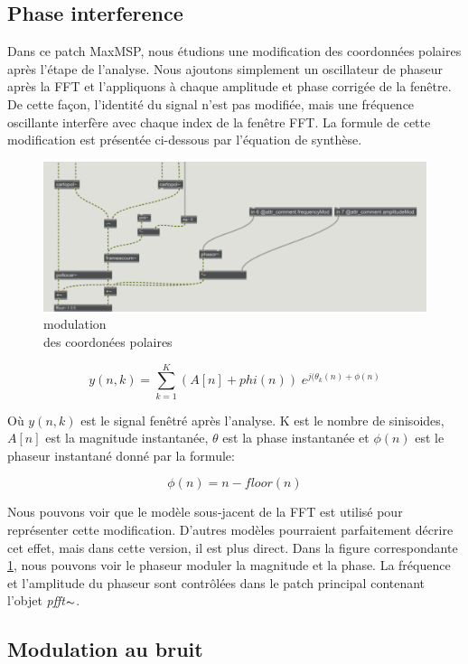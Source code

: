 \subsection{Phase interference}
    Dans ce patch MaxMSP, nous étudions une modification des coordonnées polaires après l’étape de l’analyse. Nous ajoutons simplement un oscillateur de phaseur après la FFT et l’appliquons à chaque amplitude et phase corrigée de la fenêtre. De cette façon, l'identité du signal n'est pas modifiée, mais une fréquence oscillante interfère avec chaque index de la fenêtre FFT. La formule de cette modification est présentée ci-dessous par l'équation de synthèse.

\begin{figure}
  \centering
  \includegraphics[width= 0.5 \textwidth]{Graphs/phasorInt.png}
  \caption{modulation \\ des coordonées polaires}
  \label{phasorInt}
\end{figure}

    \begin{equation}
      y(n, k) = \sum_{k=1}^K (A[n]+phi(n)) \; e^{j (\theta_k(n) +\phi(n)}
    \end{equation}
    
    Où $y (n, k)$ est le signal fenêtré après l'analyse. K est le nombre de sinisoides, $ A [n] $ est la magnitude instantanée, $ \theta $ est la phase instantanée et $ \phi (n) $ est le phaseur instantané donné par la formule:

    \begin{equation*}
        \phi(n) = n - floor(n)
    \end{equation*}

    Nous pouvons voir que le modèle sous-jacent de la FFT est utilisé pour représenter cette modification. D'autres modèles pourraient parfaitement décrire cet effet, mais dans cette version, il est plus direct. Dans la figure correspondante \ref{phasorInt}, nous pouvons voir le phaseur moduler la magnitude et la phase. La fréquence et l'amplitude du phaseur sont contrôlées dans le patch principal contenant l'objet \textit{pfft$\thicksim $}.

\subsection{Modulation au bruit}


